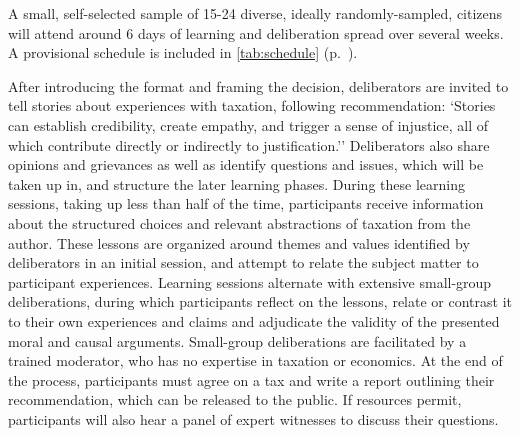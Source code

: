 A small, self-selected sample of 15-24 diverse, ideally randomly-sampled, citizens will attend around 6 days of learning and deliberation spread over several weeks. A provisional schedule is included in \autoref{tab:schedule} (p.~\pageref{tab:schedule}).




After introducing the format and framing the decision, deliberators are invited to tell stories about experiences with taxation, following \cite[67]{Mansbridge2010a} recommendation:
`Stories can establish credibility, create empathy, and trigger a sense of injustice, all of which contribute directly or indirectly to justification.''
Deliberators also share opinions and grievances as well as identify questions and issues, which will be taken up in, and structure the later learning phases.
During these learning sessions, taking up less than half of the time, participants receive information about the structured choices and relevant abstractions of taxation from the author.
These lessons are organized around themes and values identified by deliberators in an initial session, and attempt to relate the subject matter to participant experiences.
Learning sessions alternate with extensive small-group deliberations, during which participants reflect on the lessons, relate or contrast it to their own experiences and claims and adjudicate the validity of the presented moral and causal arguments.
Small-group deliberations are facilitated by a trained moderator, who has no expertise in taxation or economics.
At the end of the process, participants must agree on a tax and write a report outlining their recommendation, which can be released to the public.
If resources permit, participants will also hear a panel of expert witnesses to discuss their questions.


